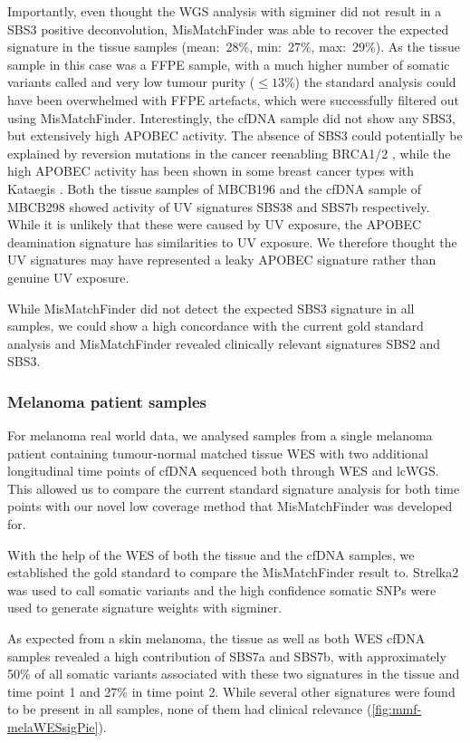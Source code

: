 Importantly, even thought the WGS analysis with sigminer did not result in a SBS3 positive deconvolution, MisMatchFinder was able to recover the expected signature in the tissue samples (mean:~28\%, min:~27\%, max:~29\%). As the tissue sample in this case was a FFPE sample, with a much higher number of somatic variants called and very low tumour purity ($\leq 13\%$) the standard analysis could have been overwhelmed with FFPE artefacts, which were successfully filtered out using MisMatchFinder. Interestingly, the cfDNA sample did not show any SBS3, but extensively high APOBEC activity. The absence of SBS3 could potentially be explained by reversion mutations in the cancer reenabling BRCA1/2 \cite{Lin2018a}, while the high APOBEC activity has been shown in some breast cancer types with Kataegis \cite{Alexandrov2020,Rebhandl2015}. Both the tissue samples of MBCB196 and the cfDNA sample of MBCB298 showed activity of UV signatures SBS38 and SBS7b respectively. While it is unlikely that these were caused by UV exposure, the APOBEC deamination signature has similarities to UV exposure. We therefore thought the UV signatures may have represented a leaky APOBEC signature rather than genuine UV exposure.

While MisMatchFinder did not detect the expected SBS3 signature in all samples, we could show a high concordance with the current gold standard analysis and MisMatchFinder revealed clinically relevant signatures SBS2 and SBS3. 

\subsubsection{Melanoma patient samples}
\label{mmf-sec:melpatients}

For melanoma real world data, we analysed samples from a single melanoma patient containing tumour-normal matched tissue WES with two additional longitudinal time points of cfDNA sequenced both through WES and lcWGS. This allowed us to compare the current standard signature analysis for both time points with our novel low coverage method that MisMatchFinder was developed for.

With the help of the WES of both the tissue and the cfDNA samples, we established the gold standard to compare the MisMatchFinder result to.  Strelka2 was used to call somatic variants and the high confidence somatic SNPs were used to generate signature weights with sigminer.

As expected from a skin melanoma, the tissue as well as both WES cfDNA samples revealed a high contribution of SBS7a and SBS7b, with approximately 50\%  of all somatic variants associated with these two signatures in the tissue and time point 1 and 27\% in time point 2. While several other signatures were found to be present in all samples, none of them had clinical relevance (\autoref{fig:mmf-melaWESsigPie}).

